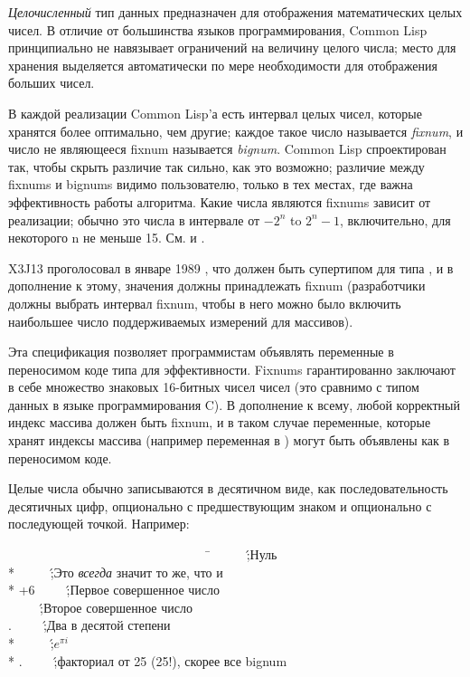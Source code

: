 \emph{Целочисленный} тип данных предназначен для отображения
математических целых чисел. В отличие от большинства языков
программирования, Common Lisp принципиально не навязывает
ограничений на величину целого числа; место для хранения
выделяется автоматически по мере необходимости для отображения
больших чисел.

В каждой реализации Common Lisp'а есть интервал целых чисел,
которые хранятся более оптимально, чем другие; каждое такое число
называется \emph{fixnum}, и число не являющееся fixnum называется
\emph{bignum}. Common Lisp спроектирован так, чтобы скрыть различие так
сильно, как это возможно; различие между fixnums и bignums видимо
пользователю, только в тех местах, где важна эффективность работы
алгоритма. Какие числа являются fixnums зависит от реализации;
обычно это числа в интервале от $-2^{n}$ to
$2^{n}-1$, включительно, для некоторого n не меньше
15. См.  и . 

\begin{new}
X3J13 проголосовал в январе 1989
, 
что  должен быть супертипом для типа , 
и в дополнение к этому, значения  должны
принадлежать fixnum (разработчики должны выбрать интервал fixnum,
чтобы в него можно было включить наибольшее число поддерживаемых
измерений для массивов). 
\beforenoterule
\begin{rationale}
Эта спецификация позволяет программистам объявлять
переменные в переносимом коде типа  для
эффективности. Fixnums гарантированно заключают в себе множество
знаковых 16-битных чисел чисел (это сравнимо с типом
данных  в языке программирования C). В дополнение к
всему, любой корректный индекс массива должен быть fixnum, и в
таком случае переменные, которые хранят индексы массива (например
переменная в ) могут быть объявлены как  в
переносимом коде. 
\end{rationale}
\afternoterule
\end{new}

Целые числа обычно записываются в десятичном виде, как последовательность десятичных цифр, опционально с предшествующим знаком и опционально с последующей точкой. Например:
\begin{lisp}
~~~~~~~~~~~~~~~~~~~~~~~~~~~~~~~~\=\kill
{}~~~~~\';\textrm{Нуль} \\*
~~~~~\';\textrm{Это \emph{всегда} значит то же, что и } \\*
\>+6~~~~~\';\textrm{Первое совершенное число} \\
~~~~~\';\textrm{Второе совершенное число} \\
.~~~~~\';\textrm{Два в десятой степени} \\*
~~~~~\';\textrm{$e^{\pi i}$} \\*
.~~~~~\';\textrm{факториал от 25 (25!),
скорее все bignum}
\end{lisp}

